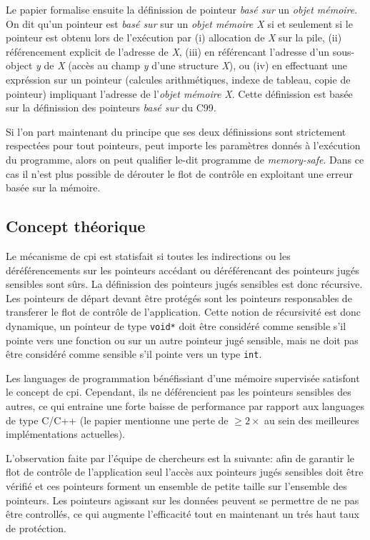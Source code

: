 Le papier formalise ensuite la définission de pointeur \textit{basé sur} un \textit{objet mémoire}. On dit qu'un pointeur est \textit{basé sur} sur un \textit{objet mémoire X} si et seulement si le pointeur est obtenu lors de l'exécution par (i) allocation de \textit{X} sur la pile, (ii) référencement explicit de l'adresse de \textit{X}, (iii) en référencant l'adresse d'un sous-object \textit{y} de \textit{X} (accès au champ \textit{y} d'une structure \textit{X}), ou (iv) en effectuant une expréssion sur un pointeur (calcules arithmétiques, indexe de tableau, copie de pointeur) impliquant l'adresse de l'\textit{objet mémoire X}. Cette définission est basée sur la définission des pointeurs \textit{basé sur} du C99.

\newpage

Si l'on part maintenant du principe que ses deux définissions sont strictement respectées pour tout pointeurs, peut importe les paramètres donnés à l'exécution du programme, alors on peut qualifier le-dit programme de \textit{memory-safe}. Dans ce cas il n'est plus possible de dérouter le flot de contrôle en exploitant une erreur basée sur la mémoire.

\subsection{Concept théorique}

Le mécanisme de \gls{cpi} est statisfait si toutes les indirections ou les déréférencements sur les pointeurs accédant ou déréférencant des pointeurs jugés \og sensibles \fg sont sûrs. La définission des pointeurs jugés sensibles est donc récursive. Les pointeurs de départ devant être protégés sont les pointeurs responsables de transferer le flot de contrôle de l'application. Cette notion de récursivité est donc dynamique, un pointeur de type \texttt{void*} doit être considéré comme sensible s'il pointe vers une fonction ou sur un autre pointeur jugé sensible, mais ne doit pas être considéré comme sensible s'il pointe vers un type \texttt{int}.

Les languages de programmation bénéfissiant d'une mémoire supervisée satisfont le concept de \gls{cpi}. Cependant, ils ne déférencient pas les pointeurs sensibles des autres, ce qui entraine une forte baisse de performance par rapport aux languages de type C/C++ (le papier mentionne une perte de $\geq2\times$ au sein des meilleures implémentations actuelles).

L'observation faite par l'équipe de chercheurs est la suivante: afin de garantir le flot de contrôle de l'application seul l'accès aux pointeurs jugés sensibles doit être vérifié et ces pointeurs forment un ensemble de petite taille sur l'ensemble des pointeurs. Les pointeurs agissant sur les données peuvent se permettre de ne pas être controllés, ce qui augmente l'efficacité tout en maintenant un trés haut taux de protéction.

